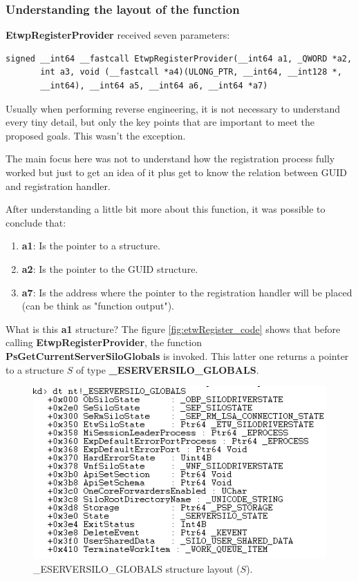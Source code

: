 \subsubsection{Understanding the layout of the function}
{\bfseries EtwpRegisterProvider} received seven parameters:
\begin{verbatim}
signed __int64 __fastcall EtwpRegisterProvider(__int64 a1, _QWORD *a2,
       int a3, void (__fastcall *a4)(ULONG_PTR, __int64, __int128 *,
       __int64), __int64 a5, __int64 a6, __int64 *a7)
\end{verbatim}

Usually when performing reverse engineering, it is not necessary to understand every tiny detail, but only the key points that are important to meet the proposed goals. This wasn't the exception. 

The main focus here was not to understand how the registration process fully worked but just to get an idea of it plus get to know the relation between GUID and registration handler.

After understanding a little bit more about this function, it was possible to conclude that:
\begin{enumerate}
\item {\bfseries a1}: Is the pointer to a structure.
\item {\bfseries a2}: Is the pointer to the GUID structure. 
\item {\bfseries a7}: Is the address where the pointer to the registration handler will be placed (can be think as "function output").
\end{enumerate}

What is this {\bfseries a1} structure?
The figure \ref{fig:etwRegister_code} shows that before calling {\bfseries EtwpRegisterProvider}, the function {\bfseries PsGetCurrentServerSiloGlobals} is invoked. This latter one returns a pointer to a structure $S$ of type {\bfseries \_ESERVERSILO\_GLOBALS}. 

\begin{centering}
\begin{figure}[H]
  \includegraphics[width=12cm]{images/ESILOGLOBALS_structure.png}
  \caption[]{\_ESERVERSILO\_GLOBALS structure layout ($S$).}
  \label{fig:eserversilo_globals_structure}
\end{figure}
\end{centering}

